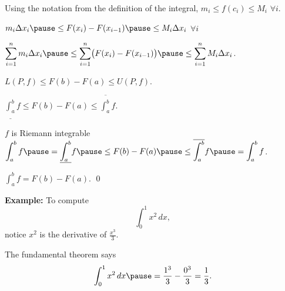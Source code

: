 \documentclass[10pt,aspectratio=149]{beamer}
\begin{document}
\begin{frame}
Using the notation from the definition of the integral, \quad
$m_i \leq f(c_i) \leq M_i$ \quad $\forall i$.

\pause
\medskip

\thus \quad
$m_i \Delta x_i
\pause
\leq F(x_i) - F(x_{i-1})
\pause
\leq M_i \Delta x_i$
\quad
$\forall i$

\pause
\medskip

\thus \quad
$\displaystyle
\sum_{i=1}^n m_i \Delta x_i
\pause
\leq \sum_{i=1}^n \bigl(F(x_i) - F(x_{i-1}) \bigr)
\pause
\leq \sum_{i=1}^n M_i \Delta x_i$.

\pause
\medskip

\thus \quad
$\displaystyle
L(P,f) \leq F(b)-F(a) \leq U(P,f)$.

\pause
\medskip

\thus \quad
$\displaystyle
\underline{\int_a^b} f
\leq
F(b)-F(a)
\leq
\overline{\int_a^b} f$.

\pause
\medskip

$f$ is Riemann integrable
\pause
\wthus 
$\displaystyle \int_a^b f
\pause
=
\underline{\int_a^b} f
\pause
\leq
F(b)-F(a)
\pause
\leq
\overline{\int_a^b} f
\pause
=
\int_a^b f$.

\pause
\medskip

\thus  \quad
$\displaystyle \int_a^b f = F(b)-F(a)$.
\qed

\end{frame}

\begin{frame}

\textbf{Example:}
To compute
\begin{equation*}
\int_0^1 x^2 \,dx ,
\end{equation*}
\pause
notice $x^2$ is the derivative of $\frac{x^3}{3}$.

\pause
The fundamental theorem says
\begin{equation*}
\int_0^1 x^2 \,dx
\pause
=
\frac{1^3}{3}
-
\frac{0^3}{3}
= \frac{1}{3}.
\end{equation*}

\end{frame}
\end{document}
